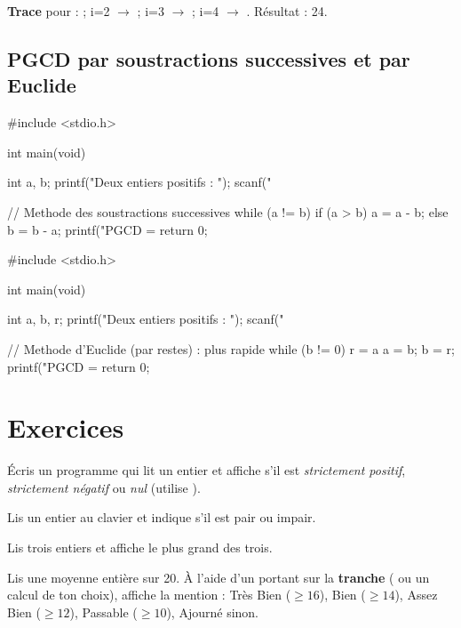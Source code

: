 \textbf{Trace} pour  :  ; i=2 $\rightarrow$  ;
i=3 $\rightarrow$  ; i=4 $\rightarrow$ . Résultat : 24.

\subsection{PGCD par soustractions successives et par Euclide}

\begin{codec}
#include <stdio.h>

int main(void) {
    int a, b;
    printf("Deux entiers positifs : ");
    scanf("%

    // Methode des soustractions successives
    while (a != b) {
        if (a > b) {
            a = a - b;
        } else {
            b = b - a;
        }
    }
    printf("PGCD = %
    return 0;
}
\end{codec}

\begin{codec}
#include <stdio.h>

int main(void) {
    int a, b, r;
    printf("Deux entiers positifs : ");
    scanf("%

    // Methode d'Euclide (par restes) : plus rapide
    while (b != 0) {
        r = a %
        a = b;
        b = r;
    }
    printf("PGCD = %
    return 0;
}
\end{codec}


\section{Exercices}


Écris un programme qui lit un entier et affiche s'il est \emph{strictement positif},
\emph{strictement négatif} ou \emph{nul} (utilise ).

Lis un entier au clavier et indique s'il est pair ou impair.

Lis trois entiers et affiche le plus grand des trois.

Lis une moyenne entière sur 20. À l'aide d'un  portant sur la
\textbf{tranche} ( ou un calcul de ton choix), affiche la
mention : Très Bien ($\geq 16$), Bien ($\geq 14$), Assez Bien ($\geq 12$),
Passable ($\geq 10$), Ajourné sinon.

